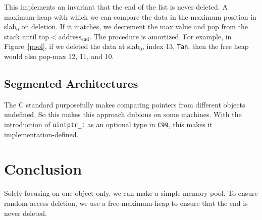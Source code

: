 \documentclass[12pt]{article}
\newcommand{\code}[1]{\colorbox{light-gray}{\texttt{#1}}}
\begin{document}
This implements an invariant that the end of the list is never deleted. A maximum-heap with which we can compare the data in the maximum position in slab$_0$ on deletion. If it matches, we decrement the max value and pop from the stack until $\text{top} < \text{address}_\text{end}$. The procedure is amortized. For example, in Figure~\ref{pool}, if we deleted the data at slab$_0$, index 13, \code{Tan}, then the free heap would also pop-max 12, 11, and 10.


\subsection{Segmented Architectures}

The C standard purposefully makes comparing pointers from different objects undefined. So this makes this approach dubious on some machines. With the introduction of \code{uintptr\_t} as an optional type in \code{C99}, this makes it implementation-defined.

\section{Conclusion}

Solely focusing on one object only, we can make a simple memory pool. To ensure random-access deletion, we use a free-maximum-heap to ensure that the end is never deleted.


\end{document}
